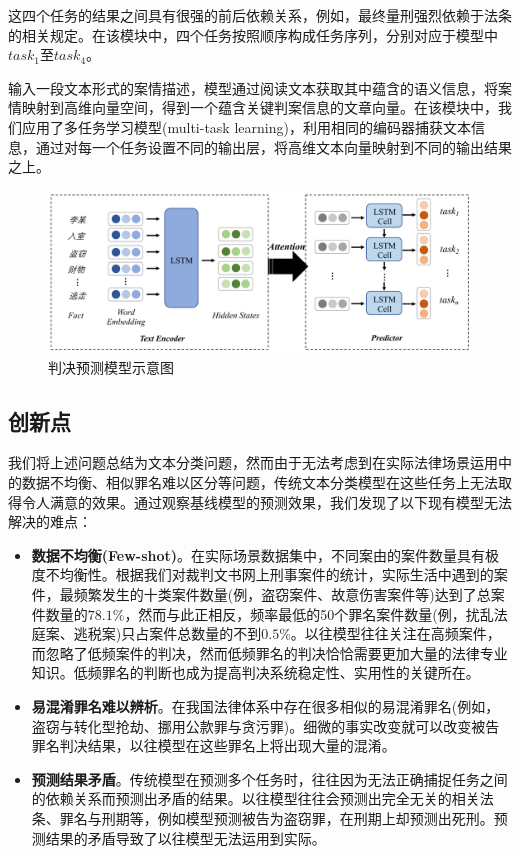 这四个任务的结果之间具有很强的前后依赖关系，例如，最终量刑强烈依赖于法条的相关规定。在该模块中，四个任务按照顺序构成任务序列，分别对应于模型中$task_{1}$至$task_{4}$。

输入一段文本形式的案情描述，模型通过阅读文本获取其中蕴含的语义信息，将案情映射到高维向量空间，得到一个蕴含关键判案信息的文章向量。在该模块中，我们应用了多任务学习模型(multi-task learning)，利用相同的编码器捕获文本信息，通过对每一个任务设置不同的输出层，将高维文本向量映射到不同的输出结果之上。

\begin{figure}[ht]
    \centering
    \includegraphics[width=\linewidth]{figures/model1}
    \caption{判决预测模型示意图}
    \label{fig:model1}
\end{figure}

\subsection{创新点}
我们将上述问题总结为文本分类问题，然而由于无法考虑到在实际法律场景运用中的数据不均衡、相似罪名难以区分等问题，传统文本分类模型在这些任务上无法取得令人满意的效果。通过观察基线模型的预测效果，我们发现了以下现有模型无法解决的难点：
\begin{itemize}
	\item \textbf{数据不均衡(Few-shot)}。在实际场景数据集中，不同案由的案件数量具有极度不均衡性。根据我们对裁判文书网上刑事案件的统计，实际生活中遇到的案件，最频繁发生的十类案件数量(例，盗窃案件、故意伤害案件等)达到了总案件数量的$78.1\%$，然而与此正相反，频率最低的50个罪名案件数量(例，扰乱法庭案、逃税案)只占案件总数量的不到$0.5\%$。以往模型往往关注在高频案件，而忽略了低频案件的判决，然而低频罪名的判决恰恰需要更加大量的法律专业知识。低频罪名的判断也成为提高判决系统稳定性、实用性的关键所在。
	\item \textbf{易混淆罪名难以辨析}。在我国法律体系中存在很多相似的易混淆罪名(例如，盗窃与转化型抢劫、挪用公款罪与贪污罪)。细微的事实改变就可以改变被告罪名判决结果，以往模型在这些罪名上将出现大量的混淆。
	\item \textbf{预测结果矛盾}。传统模型在预测多个任务时，往往因为无法正确捕捉任务之间的依赖关系而预测出矛盾的结果。以往模型往往会预测出完全无关的相关法条、罪名与刑期等，例如模型预测被告为盗窃罪，在刑期上却预测出死刑。预测结果的矛盾导致了以往模型无法运用到实际。
\end{itemize}

